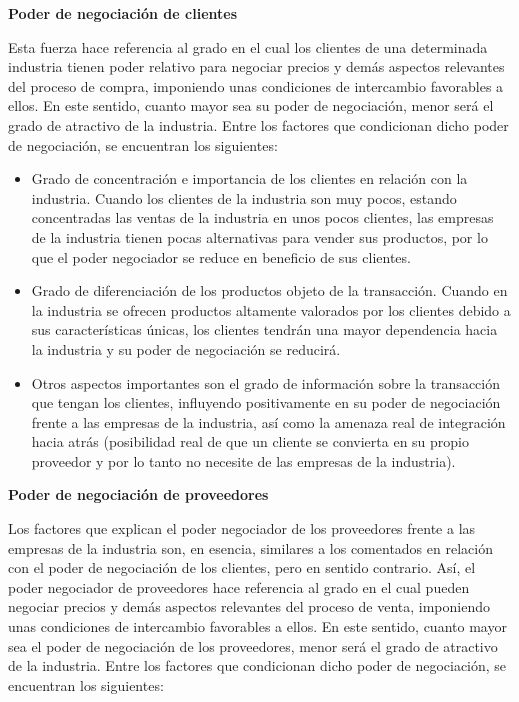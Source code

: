 \documentclass[
]{krantz}
\providecommand{\tightlist}{%
  \setlength{\itemsep}{0pt}\setlength{\parskip}{0pt}}
\begin{document}
\textbf{Poder de negociación de clientes}

Esta fuerza hace referencia al grado en el cual los clientes de una determinada industria tienen poder relativo para negociar precios y demás aspectos relevantes del proceso de compra, imponiendo unas condiciones de intercambio favorables a ellos. En este sentido, cuanto mayor sea su poder de negociación, menor será el grado de atractivo de la industria. Entre los factores que condicionan dicho poder de negociación, se encuentran los siguientes:

\begin{itemize}
\tightlist
\item
  Grado de concentración e importancia de los clientes en relación con la industria. Cuando los clientes de la industria son muy pocos, estando concentradas las ventas de la industria en unos pocos clientes, las empresas de la industria tienen pocas alternativas para vender sus productos, por lo que el poder negociador se reduce en beneficio de sus clientes.
\item
  Grado de diferenciación de los productos objeto de la transacción. Cuando en la industria se ofrecen productos altamente valorados por los clientes debido a sus características únicas, los clientes tendrán una mayor dependencia hacia la industria y su poder de negociación se reducirá.
\item
  Otros aspectos importantes son el grado de información sobre la transacción que tengan los clientes, influyendo positivamente en su poder de negociación frente a las empresas de la industria, así como la amenaza real de integración hacia atrás (posibilidad real de que un cliente se convierta en su propio proveedor y por lo tanto no necesite de las empresas de la industria).
\end{itemize}

\textbf{Poder de negociación de proveedores}

Los factores que explican el poder negociador de los proveedores frente a las empresas de la industria son, en esencia, similares a los comentados en relación con el poder de negociación de los clientes, pero en sentido contrario. Así, el poder negociador de proveedores hace referencia al grado en el cual pueden negociar precios y demás aspectos relevantes del proceso de venta, imponiendo unas condiciones de intercambio favorables a ellos. En este sentido, cuanto mayor sea el poder de negociación de los proveedores, menor será el grado de atractivo de la industria. Entre los factores que condicionan dicho poder de negociación, se encuentran los siguientes:
\end{document}
